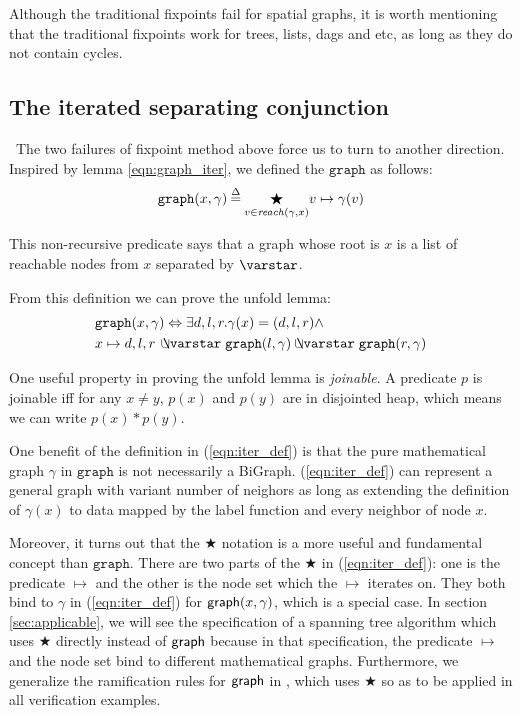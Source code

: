 Although the traditional fixpoints fail for spatial graphs, it is
worth mentioning that the traditional fixpoints work for trees, lists,
dags and etc, as long as they do not contain cycles.

\subsection{The iterated separating conjunction}\
The two failures of fixpoint method above force us to turn to another
direction. Inspired by lemma \ref{eqn:graph_iter}, we defined the
$\mathtt{graph}$ as follows:
\begin{equation}\label{eqn:iter_def}
  \mathtt{graph}(x, \gamma)\mathbin{\stackrel{\Delta}{=}}\underset{v\in\mathit{reach}(\gamma, x)}{\bigstar} v\mapsto\gamma(v)
\end{equation}

This non-recursive predicate says that a graph whose root is $x$ is a
list of reachable nodes from $x$ separated by $\scon$.

\label{sec:foldunfold} From this definition we can prove the unfold lemma:
\begin{equation*}
  \begin{split}
  & \mathtt{graph}(x, \gamma) \Leftrightarrow \exists d,l,r
    . \gamma(x)=(d,l,r) \wedge \\ & x \mapsto d,l,r\, \ocon
    \mathtt{graph}(l, \gamma) \ocon \mathtt{graph}(r, \gamma)
  \end{split}
\end{equation*}

One useful property in proving the unfold lemma is \emph{joinable}. A
predicate $p$ is joinable iff for any $x\neq y$, $p(x)$ and $p(y)$ are
in disjointed heap, which means we can write $p(x) * p(y)$.

One benefit of the definition in (\ref{eqn:iter_def}) is that the pure
mathematical graph $\gamma$ in $\mathtt{graph}$ is not necessarily a
BiGraph. (\ref{eqn:iter_def}) can represent a general graph with
variant number of neighors as long as extending the definition of
$\gamma(x)$ to data mapped by the label function and every neighbor of
node $x$.

Moreover, it turns out that the $\bigstar$ notation is a more useful
and fundamental concept than $\mathtt{graph}$. There are two parts of
the $\bigstar$ in (\ref{eqn:iter_def}): one is the predicate $\mapsto$
and the other is the node set which the $\mapsto$ iterates on. They
both bind to $\gamma$ in (\ref{eqn:iter_def}) for $\mathsf{graph}(x,
\gamma)$, which is a special case. In section \ref{sec:applicable}, we
will see the specification of a spanning tree algorithm which uses
$\bigstar$ directly instead of $\mathsf{graph}$ because in that
specification, the predicate $\mapsto$ and the node set bind to
different mathematical graphs. Furthermore, we generalize the
ramification rules for $\mathsf{graph}$ in \cite{hobor:ramification}, which
uses $\bigstar$ so as to be applied in all verification examples.

